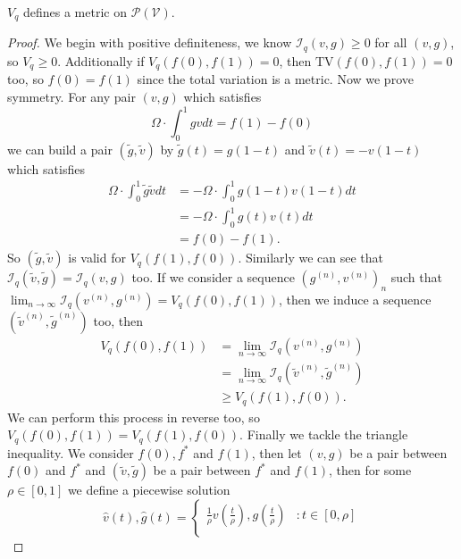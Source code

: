 \documentclass[10pt,a4paper]{amsart}
\newcommand{\VV}{\mathcal{V}}
\begin{document}
\begin{prop}$V_q$ defines a metric on $\mathcal{P}(\VV)$.
\end{prop}

\begin{proof}
    We begin with positive definiteness, we know $\mathcal{I}_q(v,g) \geq 0$ for all $(v,g)$, so $V_q \geq 0$. Additionally if $V_q(f(0),f(1)) = 0$, then $\text{TV}(f(0),f(1)) = 0$ too, so $f(0) = f(1)$ since the total variation is a metric. Now we prove symmetry. For any pair $(v,g)$ which satisfies
    \begin{equation*}
        \Omega \cdot \int_0^1 gv dt = f(1) - f(0)
    \end{equation*}
    we can build a pair $(\tilde{g},\tilde{v})$ by $\tilde{g}(t) = g(1-t)$ and $\tilde{v}(t) = -v(1-t)$ which satisfies \begin{align*}
        \Omega \cdot \int_0^1 \tilde{g}\tilde{v} dt &= -\Omega \cdot \int_0^1 g(1-t)v(1-t) dt \\
        &= -\Omega \cdot \int_0^1 g(t)v(t) dt \\
        &= f(0) - f(1).
    \end{align*}
    So $(\tilde{g},\tilde{v})$ is valid for $V_q(f(1),f(0))$. Similarly we can see that $\mathcal{I}_q(\tilde{v},\tilde{g}) = \mathcal{I}_q(v,g)$ too. If we consider a sequence $(g^{(n)},v^{(n)})_n$ such that $\lim_{n \rightarrow \infty} \mathcal{I}_q(v^{(n)},g^{(n)}) = V_q(f(0),f(1))$, then we induce a sequence $(\tilde{v}^{(n)},\tilde{g}^{(n)})$ too, then
    \begin{align*}
        V_q(f(0),f(1)) &= \lim_{n \rightarrow \infty}\mathcal{I}_q(v^{(n)},g^{(n)})\\
        &=\lim_{n \rightarrow \infty} \mathcal{I}_q(\tilde{v}^{(n)},\tilde{g}^{(n)}) \\
        &\geq V_q(f(1),f(0)).
    \end{align*}
    We can perform this process in reverse too, so $V_q(f(0),f(1)) = V_q(f(1),f(0))$. Finally we tackle the triangle inequality. We consider $f(0),f^*$ and $f(1)$, then let $(v,g)$ be a pair between $f(0)$ and $f^*$ and $(\tilde{v},\tilde{g})$ be a pair between $f^*$ and $f(1)$, then for some $\rho \in [0,1]$ we define a piecewise solution
    \begin{equation*}
    \hat{v}(t),\hat{g}(t) = 
        \begin{cases}
            \frac{1}{\rho}v\left(\frac{t}{\rho}\right),g\left(\frac{t}{\rho}\right) &: t \in [0,\rho] \\

\end{cases}
\end{equation*}
\end{proof}
\end{document}
